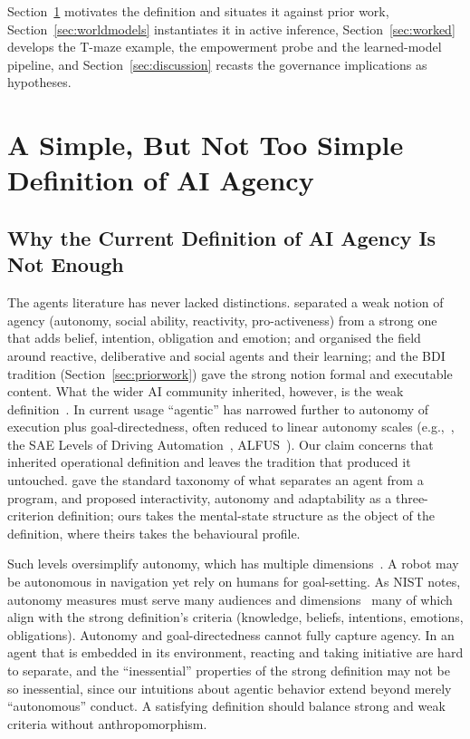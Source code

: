 \documentclass[letterpaper]{article} %
\theoremstyle{definition}
\begin{document}
Section~\ref{sec:definition} motivates the definition and situates it against prior work, Section~\ref{sec:worldmodels} instantiates it in active inference, Section~\ref{sec:worked} develops the T-maze example, the empowerment probe and the learned-model pipeline, and Section~\ref{sec:discussion} recasts the governance implications as hypotheses.

\section{A Simple, But Not Too Simple Definition of AI Agency}\label{sec:definition}
\subsection{Why the Current Definition of AI Agency Is Not Enough}

The agents literature has never lacked distinctions. \citet{wooldridgeIntelligentAgentsTheory1995} separated a weak notion of agency (autonomy, social ability, reactivity, pro-activeness) from a strong one that adds belief, intention, obligation and emotion; \citet{stoneMultiagentSurveyML2000} and \citet{jenningsRoadmapAgentResearch1998} organised the field around reactive, deliberative and social agents and their learning; and the BDI tradition (Section~\ref{sec:priorwork}) gave the strong notion formal and executable content. What the wider AI community inherited, however, is the weak definition~\citep{luckConceptualFrameworkAgent2001}. In current usage ``agentic'' has narrowed further to autonomy of execution plus goal-directedness, often reduced to linear autonomy scales (e.g.,~\citep{shavitPracticesGoverningAgentic}, the SAE Levels of Driving Automation~\citep{vyasKeySafetyDesign}, ALFUS~\citep{huangAutonomyMeasuresRobots2008}). Our claim concerns that inherited operational definition and leaves the tradition that produced it untouched. \citet{franklinAgentOrProgram1997} gave the standard taxonomy of what separates an agent from a program, and \citet{floridiMoralityArtificialAgents2004} proposed interactivity, autonomy and adaptability as a three-criterion definition; ours takes the mental-state structure as the object of the definition, where theirs takes the behavioural profile.

Such levels oversimplify autonomy, which has multiple dimensions~\citep{staytonItsTimeRethink2020}. A robot may be autonomous in navigation yet rely on humans for goal-setting. As NIST notes, autonomy measures must serve many audiences and dimensions~\citep{huangFrameworkAutonomyLevels2005} many of which align with the strong definition's criteria (knowledge, beliefs, intentions, emotions, obligations). Autonomy and goal-directedness cannot fully capture agency. In an agent that is embedded in its environment, reacting and taking initiative are hard to separate, and the ``inessential'' properties of the strong definition may not be so inessential, since our intuitions about agentic behavior extend beyond merely ``autonomous'' conduct. A satisfying definition should balance strong and weak criteria without anthropomorphism.
\end{document}
